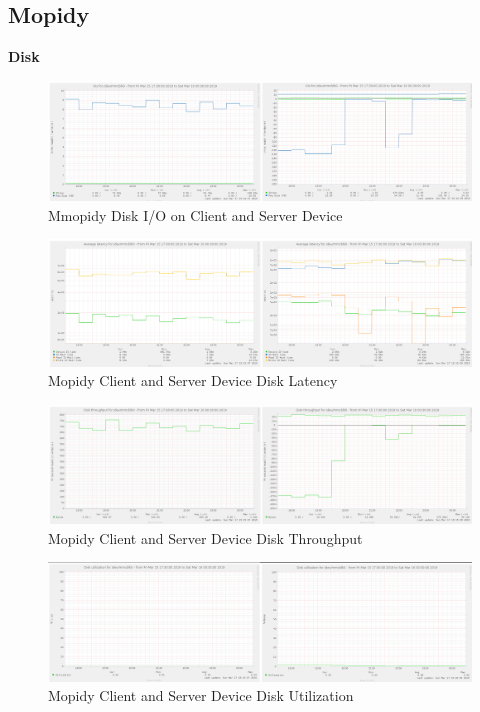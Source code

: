 \documentclass[11pt,a4paper,headinclude=false,footinclude=false]{scrreprt}
\begin{document}
\subsection{Mopidy}\label{mopidy-2}

\textbf{Disk}

\begin{figure}[H]
\includegraphics{ResultsAndAnalysis/MopidyServerTestImages/005MopidyDiskIO.png}
\centering
\caption{Mmopidy Disk I/O on Client and Server Device}
\label{MopidyDiskIO}
\end{figure}

\begin{figure}[H]
\includegraphics{ResultsAndAnalysis/MopidyServerTestImages/006MopidyDiskLatency.png}
\centering
\caption{Mopidy Client and Server Device Disk Latency}
\label{MopidyDiskLatency}
\end{figure}

\begin{figure}[H]
\includegraphics{ResultsAndAnalysis/MopidyServerTestImages/007MopidyDiskThroughput.png}
\centering
\caption{Mopidy Client and Server Device Disk Throughput}
\label{MopidyDiskThroughput}
\end{figure}

\begin{figure}[H]
\includegraphics{ResultsAndAnalysis/MopidyServerTestImages/009MopidyDiskUtilization.png}
\centering
\caption{Mopidy Client and Server Device Disk Utilization}
\label{MopidyDiskUtil}
\end{figure}
\end{document}
